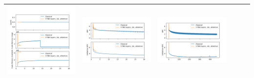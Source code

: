 \begin{longtable}[]{@{}llllll@{}}
\includegraphics{sum_memory.png} & \includegraphics{sum_frac.png} &
\includegraphics{sum_frac_full.png}\tabularnewline
\bottomrule
\end{longtable}

